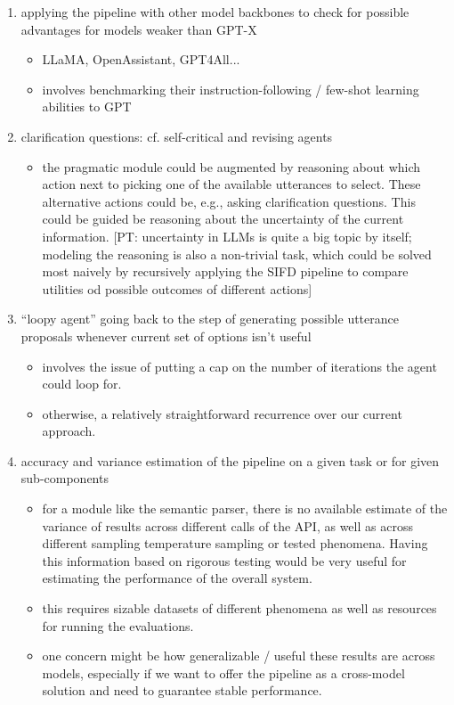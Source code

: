 \documentclass[fleqn,reqno,10pt]{article}
\newcommand{\pt}[1]{\textcolor{CSP-accent-1}{[PT: #1]}}
\begin{document}
\begin{enumerate}
\begin{itemize}
        \end{itemize}
    \item applying the pipeline with other model backbones to check for possible advantages for models weaker than GPT-X
        \begin{itemize}
            \item LLaMA, OpenAssistant, GPT4All...
            \item involves benchmarking their instruction-following / few-shot learning abilities to GPT
        \end{itemize}
    \item clarification questions: cf. self-critical and revising agents
    \begin{itemize}
        \item the pragmatic module could be augmented by reasoning about which action next to picking one of the available utterances to select. These alternative actions could be, e.g., asking clarification questions. This could be guided be reasoning about the uncertainty of the current information. \pt{uncertainty in LLMs is quite a big topic by itself; modeling the reasoning is also a non-trivial task, which could be solved most naively by recursively applying the SIFD pipeline to compare utilities od possible outcomes of different actions}
    \end{itemize}
    \item ``loopy agent'' going back to the step of generating possible utterance proposals whenever current set of options isn't useful
    \begin{itemize}
        \item involves the issue of putting a cap on the number of iterations the agent could loop for.
        \item otherwise, a relatively straightforward recurrence over our current approach.
    \end{itemize}
    \item accuracy and variance estimation of the pipeline on a given task or for given sub-components
    \begin{itemize}
        \item for a module like the semantic parser, there is no available estimate of the variance of results across different calls of the API, as well as across different sampling temperature sampling or tested phenomena. Having this information based on rigorous testing would be very useful for estimating the performance of the overall system.
        \item this requires sizable datasets of different phenomena as well as resources for running the evaluations.
        \item one concern might be how generalizable / useful these results are across models, especially if we want to offer the pipeline as a cross-model solution and need to guarantee stable performance.
    \end{itemize}
\end{enumerate}
\end{document}
